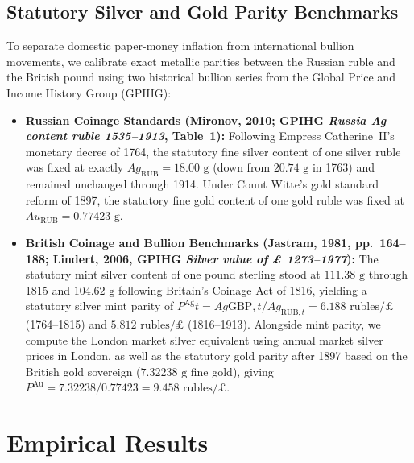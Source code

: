\documentclass[11pt,a4paper]{article}
\begin{document}
\subsection{Statutory Silver and Gold Parity Benchmarks}
To separate domestic paper-money inflation from international bullion movements, we calibrate exact metallic parities between the Russian ruble and the British pound using two historical bullion series from the Global Price and Income History Group (GPIHG):
\begin{itemize}
\item \textbf{Russian Coinage Standards (Mironov, 2010; GPIHG \emph{Russia Ag content ruble 1535--1913}, Table~1):} Following Empress Catherine~II's monetary decree of 1764, the statutory fine silver content of one silver ruble was fixed at exactly $Ag_{\mathrm{RUB}} = 18.00\text{ g}$ (down from $20.74\text{ g}$ in 1763) and remained unchanged through 1914. Under Count Witte's gold standard reform of 1897, the statutory fine gold content of one gold ruble was fixed at $Au_{\mathrm{RUB}} = 0.77423\text{ g}$.
\item \textbf{British Coinage and Bullion Benchmarks (Jastram, 1981, pp.~164--188; Lindert, 2006, GPIHG \emph{Silver value of £ 1273--1977}):} The statutory mint silver content of one pound sterling stood at $111.38\text{ g}$ through 1815 and $104.62\text{ g}$ following Britain's Coinage Act of 1816, yielding a statutory silver mint parity of $P^{\mathrm{Ag}}t = Ag{\mathrm{GBP},t} / Ag_{\mathrm{RUB},t} = 6.188\text{ rubles/£}$ (1764--1815) and $5.812\text{ rubles/£}$ (1816--1913). Alongside mint parity, we compute the London market silver equivalent using annual market silver prices in London, as well as the statutory gold parity after 1897 based on the British gold sovereign ($7.32238\text{ g}$ fine gold), giving $P^{\mathrm{Au}} = 7.32238 / 0.77423 = 9.458\text{ rubles/£}$.
\end{itemize}
\section{Empirical Results}
\end{document}

